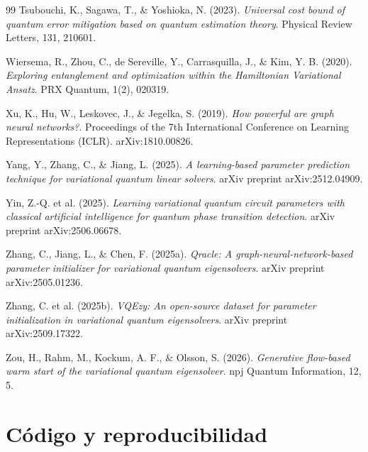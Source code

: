 \documentclass[11pt,a4paper,spanish]{book}
\begin{document}
\begin{thebibliography}{99}
 Tsubouchi, K., Sagawa, T., \& Yoshioka, N. (2023). \emph{Universal cost bound of quantum error mitigation based on quantum estimation theory}. Physical Review Letters, 131, 210601.

 Wiersema, R., Zhou, C., de Sereville, Y., Carrasquilla, J., \& Kim, Y. B. (2020). \emph{Exploring entanglement and optimization within the Hamiltonian Variational Ansatz}. PRX Quantum, 1(2), 020319.

 Xu, K., Hu, W., Leskovec, J., \& Jegelka, S. (2019). \emph{How powerful are graph neural networks?}. Proceedings of the 7th International Conference on Learning Representations (ICLR). arXiv:1810.00826.

 Yang, Y., Zhang, C., \& Jiang, L. (2025). \emph{A learning-based parameter prediction technique for variational quantum linear solvers}. arXiv preprint arXiv:2512.04909.

 Yin, Z.-Q. et al. (2025). \emph{Learning variational quantum circuit parameters with classical artificial intelligence for quantum phase transition detection}. arXiv preprint arXiv:2506.06678.

 Zhang, C., Jiang, L., \& Chen, F. (2025a). \emph{Qracle: A graph-neural-network-based parameter initializer for variational quantum eigensolvers}. arXiv preprint arXiv:2505.01236.

 Zhang, C. et al. (2025b). \emph{VQEzy: An open-source dataset for parameter initialization in variational quantum eigensolvers}. arXiv preprint arXiv:2509.17322.

 Zou, H., Rahm, M., Kockum, A. F., \& Olsson, S. (2026). \emph{Generative flow-based warm start of the variational quantum eigensolver}. npj Quantum Information, 12, 5.

\end{thebibliography}



\appendix

\chapter{Código y reproducibilidad}
\label{sec:codigo}
\end{document}
